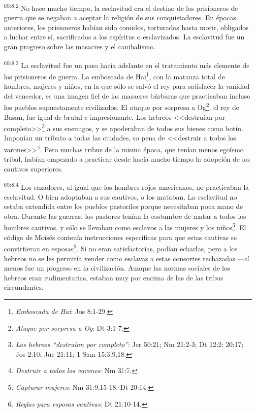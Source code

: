 \par
\textsuperscript{69:8.2} No hace mucho tiempo, la esclavitud era el destino de los prisioneros de guerra que se negaban a aceptar la religión de sus conquistadores. En épocas anteriores, los prisioneros habían sido comidos, torturados hasta morir, obligados a luchar entre sí, sacrificados a los espíritus o esclavizados. La esclavitud fue un gran progreso sobre las masacres y el canibalismo.

\par
\textsuperscript{69:8.3} La esclavitud fue un paso hacia adelante en el tratamiento más clemente de los prisioneros de guerra. La emboscada de Hai\footnote{\textit{Emboscada de Hai}: Jos 8:1-29.}, con la matanza total de hombres, mujeres y niños, en la que sólo se salvó el rey para satisfacer la vanidad del vencedor, es una imagen fiel de las masacres bárbaras que practicaban incluso los pueblos supuestamente civilizados. El ataque por sorpresa a Og\footnote{\textit{Ataque por sorpresa a Og}: Dt 3:1-7.}, el rey de Basan, fue igual de brutal e impresionante. Los hebreos <<destruían por completo>>\footnote{\textit{Los hebreos ``destruían por completo''}: Jer 50:21; Nm 21:2-3; Dt 12:2; 20:17; Jos 2:10; Jue 21:11; 1 Sam 15:3,9,18.} a sus enemigos, y se apoderaban de todos sus bienes como botín. Imponían un tributo a todas las ciudades, so pena de <<destruir a todos los varones>>\footnote{\textit{Destruir a todos los varones}: Nm 31:7.}. Pero muchas tribus de la misma época, que tenían menos egoísmo tribal, habían empezado a practicar desde hacía mucho tiempo la adopción de los cautivos superiores.

\par
\textsuperscript{69:8.4} Los cazadores, al igual que los hombres rojos americanos, no practicaban la esclavitud. O bien adoptaban a sus cautivos, o los mataban. La esclavitud no estaba extendida entre los pueblos pastoriles porque necesitaban poca mano de obra. Durante las guerras, los pastores tenían la costumbre de matar a todos los hombres cautivos, y sólo se llevaban como esclavos a las mujeres y los niños\footnote{\textit{Capturar mujeres}: Nm 31:9,15-18; Dt 20:14.}. El código de Moisés contenía instrucciones específicas para que estas cautivas se convirtieran en esposas\footnote{\textit{Reglas para esposas cautivas}: Dt 21:10-14.}. Si no eran satisfactorias, podían echarlas, pero a los hebreos no se les permitía vender como esclavas a estas consortes rechazadas ---al menos fue un progreso en la civilización. Aunque las normas sociales de los hebreos eran rudimentarias, estaban muy por encima de las de las tribus circundantes.

